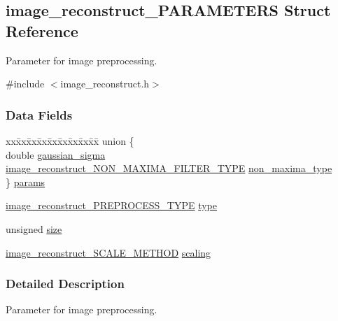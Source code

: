 \hypertarget{a00005}{\subsection{image\-\_\-reconstruct\-\_\-\-P\-A\-R\-A\-M\-E\-T\-E\-R\-S Struct Reference}
\label{a00005}
}


Parameter for image preprocessing.  




{\ttfamily \#include $<$image\-\_\-reconstruct.\-h$>$}

\subsubsection*{Data Fields}
\begin{DoxyCompactItemize}
\item 
\begin{tabbing}
xx\=xx\=xx\=xx\=xx\=xx\=xx\=xx\=xx\=\kill
union \{\\
\>double \hyperlink{a00005_a313aa3906270ea2e379771b644ab8c23}{gaussian\_sigma}\\
\>\hyperlink{a00013_a426aaaa85fc93215c39f26d2738b9d87}{image\_reconstruct\_NON\_MAXIMA\_FILTER\_TYPE} \hyperlink{a00005_ada9adae6433352363a8fba7ea8303cb8}{non\_maxima\_type}\\
\} \hyperlink{a00005_aff266d5a2030f7e533522cfc2daf8b66}{params}\\

\end{tabbing}\item 
\hyperlink{a00013_ac74b45c91f9169f8834162f730054133}{image\-\_\-reconstruct\-\_\-\-P\-R\-E\-P\-R\-O\-C\-E\-S\-S\-\_\-\-T\-Y\-P\-E} \hyperlink{a00005_aedf0c7f993a2910fbe0e0bcf50c1a04b}{type}
\item 
unsigned \hyperlink{a00005_af0fd001e0dab3dbc0cdb957c5df6b60b}{size}
\item 
\hyperlink{a00013_ac27dbc8bff5d1fdaa463a1c1448e134b}{image\-\_\-reconstruct\-\_\-\-S\-C\-A\-L\-E\-\_\-\-M\-E\-T\-H\-O\-D} \hyperlink{a00005_aa23534311798ee5587cc24f448f1bca9}{scaling}
\end{DoxyCompactItemize}


\subsubsection{Detailed Description}
Parameter for image preprocessing. 


